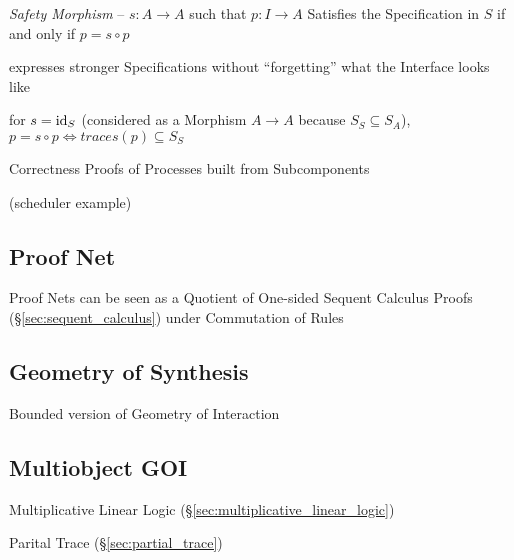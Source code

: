 \emph{Safety Morphism} -- $s: A \rightarrow A$ such that $p : I
\rightarrow A$ Satisfies the Specification in $S$ if and only if $p =
s \circ p$

expresses stronger Specifications without ``forgetting'' what the
Interface looks like

for $s = \mathrm{id}_S$ (considered as a Morphism $A \rightarrow A$ because
$S_S \subseteq S_A$), $p = s \circ p \Leftrightarrow traces(p)
\subseteq S_S$

Correctness Proofs of Processes built from Subcomponents

(scheduler example)



\subsection{Proof Net} \label{sec:proof_net}

\cite{llwiki16}

Proof Nets can be seen as a Quotient of One-sided Sequent Calculus
Proofs (\S\ref{sec:sequent_calculus}) under Commutation of Rules



\subsection{Geometry of Synthesis} \label{sec:geometry_of_synthesis}

Bounded version of Geometry of Interaction



\subsection{Multiobject GOI}\label{sec:multiobject_goi}

\cite{haghverdi-scott05}

Multiplicative Linear Logic (\S\ref{sec:multiplicative_linear_logic})

Parital Trace (\S\ref{sec:partial_trace})

